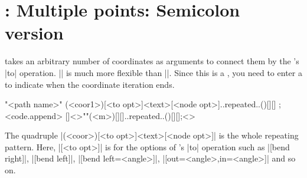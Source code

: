 \begin{tzcode}{.3}
\end{tzcode}

\begin{tzcode}{.3}
\end{tzcode}


\begin{tzcode}{.3}
\end{tzcode}




\section{\protect\cmd{\tztos}: Multiple points: Semicolon version}
\label{s:tztos}

\icmd{\tztos} takes an arbitrary number of coordinates as arguments to connect them by the \Tikz's |to| operation. |\tztos| is much more flexible than |\tzlines|. Since this is a , you need to enter a  to indicate when the coordinate iteration ends.

\begin{tzdef}
"<path name>"
      (<coor1>)[<to opt>]{<text>}[<node opt>]..repeated..()[]{}[] ; <code.append>
  []<>""(<m>)[]{}[]..repeated..()[]{}[];<>
\end{tzdef}

The quadruple |(<coor>)[<to opt>]{<text>}[<node opt>]| is 
the whole repeating pattern.
Here, |[<to opt>]| is for the options of \Tikz's |to| operation such as |[bend right]|, |[bend left]|, |[bend left=<angle>]|, |[out=<angle>,in=<angle>]| and so on.


